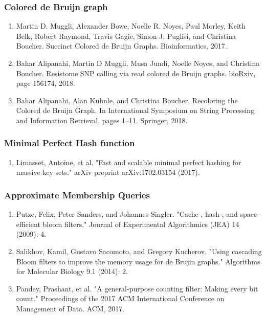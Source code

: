 \subsubsection{Colored de Bruijn graph}
\begin{enumerate}
    \item Martin D. Muggli, Alexander Bowe, Noelle R. Noyes, Paul Morley, Keith Belk, Robert Raymond, Travis Gagie, Simon J. Puglisi, and Christina Boucher. Succinct Colored de Bruijn Graphs. Bioinformatics, 2017.
    \item Bahar Alipanahi, Martin D Muggli, Musa Jundi, Noelle Noyes, and Christina Boucher. Resistome SNP calling via read colored de Bruijn graphs. bioRxiv, page 156174, 2018.
    \item Bahar Alipanahi, Alan Kuhnle, and Christina Boucher. Recoloring the Colored de Bruijn Graph. In International Symposium on String Processing and Information Retrieval, pages 1–11. Springer, 2018.
\end{enumerate}
\subsubsection{Minimal Perfect Hash function}
\begin{enumerate}
    \item Limasset, Antoine, et al. "Fast and scalable minimal perfect hashing for massive key sets." arXiv preprint arXiv:1702.03154 (2017).
\end{enumerate}
\subsubsection{Approximate Membership Queries}
\begin{enumerate}
    \item Putze, Felix, Peter Sanders, and Johannes Singler. "Cache-, hash-, and space-efficient bloom filters." Journal of Experimental Algorithmics (JEA) 14 (2009): 4.
    \item Salikhov, Kamil, Gustavo Sacomoto, and Gregory Kucherov. "Using cascading Bloom filters to improve the memory usage for de Brujin graphs." Algorithms for Molecular Biology 9.1 (2014): 2.
    \item Pandey, Prashant, et al. "A general-purpose counting filter: Making every bit count." Proceedings of the 2017 ACM International Conference on Management of Data. ACM, 2017.
\end{enumerate}
